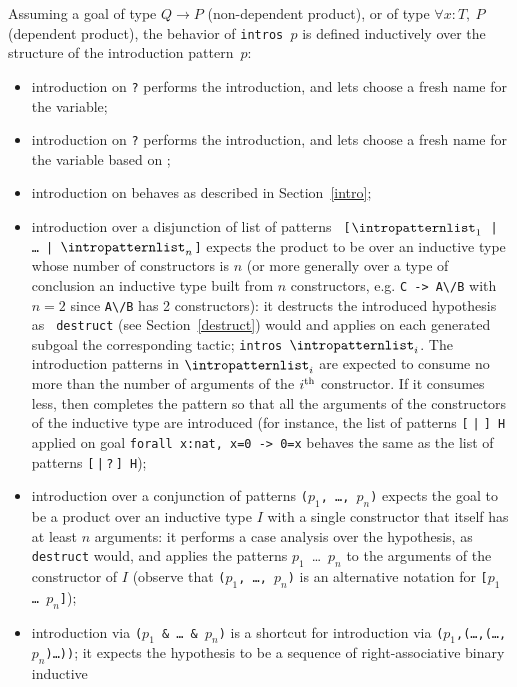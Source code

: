 Assuming a goal of type $Q \to P$ (non-dependent product), or
of type $\forall x:T,~P$ (dependent product), the behavior of
{\tt intros $p$} is defined inductively over the structure of the
introduction pattern~$p$:
\begin{itemize}
\item introduction on \texttt{?} performs the introduction, and lets {\Coq}
  choose a fresh name for the variable;
\item introduction on \texttt{?\ident} performs the introduction, and
  lets {\Coq} choose a fresh name for the variable based on {\ident};
\item introduction on \texttt{\ident} behaves as described in
  Section~\ref{intro};
\item introduction over a disjunction of list of patterns {\tt
  [$\intropatternlist_{1}$ | \dots\ | $\intropatternlist_n$]} expects
  the product to be over an inductive type whose number of
  constructors is $n$ (or more generally over a type of conclusion an
  inductive type built from $n$ constructors, e.g. {\tt C ->
    A\textbackslash/B} with $n=2$ since {\tt A\textbackslash/B} has 2
  constructors): it destructs the introduced hypothesis as {\tt
    destruct} (see Section~\ref{destruct}) would and applies on each
  generated subgoal the corresponding tactic;
  \texttt{intros}~$\intropatternlist_i$. The introduction patterns in
  $\intropatternlist_i$ are expected to consume no more than the
  number of arguments of the $i^{\mbox{\scriptsize th}}$
  constructor. If it consumes less, then {\Coq} completes the pattern
  so that all the arguments of the constructors of the inductive type
  are introduced (for instance, the list of patterns {\tt [$\;$|$\;$]
    H} applied on goal {\tt forall x:nat, x=0 -> 0=x} behaves the same
  as the list of patterns {\tt [$\,$|$\,$?$\,$] H});
\item introduction over a conjunction of patterns {\tt ($p_1$, \ldots,
  $p_n$)} expects the goal to be a product over an inductive type $I$ with a
  single constructor that itself has at least $n$ arguments: it
  performs a case analysis over the hypothesis, as {\tt destruct}
  would, and applies the patterns $p_1$~\ldots~$p_n$ to the arguments
  of the constructor of $I$ (observe that {\tt ($p_1$, {\ldots},
  $p_n$)} is an alternative notation for {\tt [$p_1$ {\ldots}
  $p_n$]});
\item introduction via {\tt ($p_1$ \& \dots\ \& $p_n$)}
  is a shortcut for introduction via
  {\tt ($p_1$,(\ldots,(\dots,$p_n$)\ldots))}; it expects the
  hypothesis to be a sequence of right-associative binary inductive

\end{itemize}
